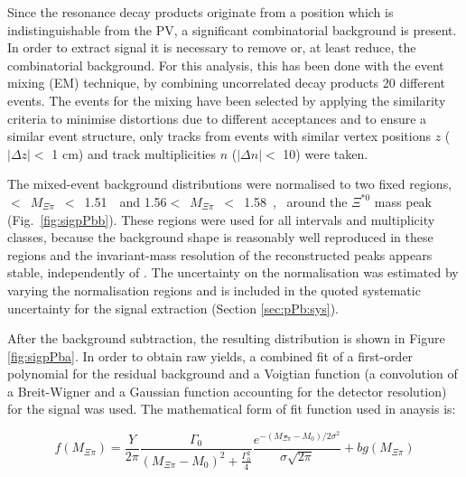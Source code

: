 Since the resonance decay products originate from a position which is indistinguishable from the PV,
a significant combinatorial background is present. In order to extract \xis signal it is necessary to remove or, at least reduce, the combinatorial background. For this analysis, this has been done with the event mixing (EM) technique, by combining uncorrelated decay products  20 different events. The events for the mixing have been selected by applying the similarity criteria to minimise distortions due to different 
acceptances and to ensure a similar event structure, only tracks from events with similar vertex 
positions $z$ ($|\Delta z| <$ 1 cm) and track multiplicities $n$ ($|\Delta n|<$ 10) were taken.

The mixed-event background distributions were normalised to two fixed regions, 
~$<$~$M_{\Xi\pi}$~$<$~1.51~\Gmass~and 1.56$<$~$M_{\Xi\pi}$~$<$~1.58~\Gmass,
~around the $\Xi^{*0}$ mass peak (Fig.~\ref{fig:sigpPbb}). These regions were used 
for all \pt intervals and multiplicity classes, because the background shape is reasonably well 
reproduced in these regions and the invariant-mass resolution of the reconstructed peaks appears stable, 
independently of \pt. The uncertainty on the normalisation was estimated by varying the normalisation regions and is included in the quoted systematic uncertainty for the signal extraction (Section \ref{sec:pPb:sys}).

After the background subtraction, the resulting distribution is shown in Figure \ref{fig:sigpPba}. In order to obtain raw yields, a combined fit of a first-order polynomial for the residual background and a Voigtian function (a convolution of a Breit-Wigner and a Gaussian function accounting for the detector resolution) for the signal was used. The mathematical form of fit function used in anaysis is: 

\begin{equation}
f(M_{\Xi\pi})= \frac{Y}{2\pi}  \frac{\Gamma_{0}}{(M_{\Xi\pi}-M_{0})^2+\frac{\Gamma_{0}^{2}}{4}} \frac{e^{-(M_{\Xi\pi}-M_{0})/2\sigma^{2}}}{\sigma\sqrt{2\pi}} + bg(M_{\Xi\pi})
\end{equation}


